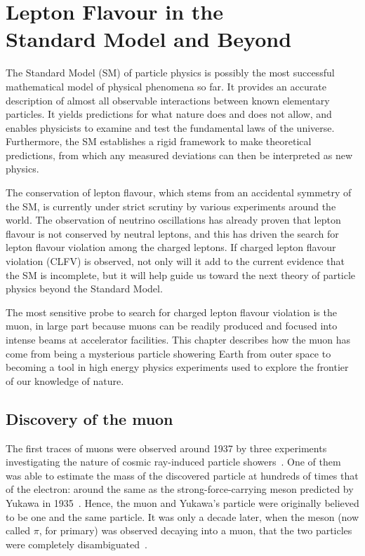 \chapter[Lepton Flavour in the Standard Model and Beyond]{Lepton Flavour in
the\\Standard Model and Beyond}\label{ch:theory}

The Standard Model (SM) of particle physics is possibly the most successful
mathematical model of physical phenomena so far. It provides an accurate
description of almost all observable interactions between known elementary
particles. It yields predictions for what nature does and does not allow, and
enables physicists to examine and test the fundamental laws of the universe.
Furthermore, the SM establishes a rigid framework to make theoretical
predictions, from which any measured deviations can then be interpreted as new
physics.

The conservation of lepton flavour, which stems from an accidental symmetry of
the SM, is currently under strict scrutiny by various experiments around the
world. The observation of neutrino oscillations has already proven that lepton
flavour is not conserved by neutral leptons, and this has driven the search for
lepton flavour violation among the charged leptons. If charged lepton flavour
violation (CLFV) is observed, not only will it add to the current evidence that
the SM is incomplete, but it will help guide us toward the next theory of
particle physics beyond the Standard Model.

The most sensitive probe to search for charged lepton flavour violation
is the muon, in large part because muons can be readily produced and focused
into intense beams at accelerator facilities. This chapter describes how the
muon has come from being a mysterious particle showering Earth from outer space
to becoming a tool in high energy physics experiments used to explore the
frontier of our knowledge of nature.


\section{Discovery of the muon}
The first traces of muons were observed around 1937 by three experiments
investigating the nature of cosmic ray-induced particle
showers~\cite{PhysRev.51.884, PhysRev.52.1198, PhysRev.52.1003}. One of them was
able to estimate the mass of the discovered particle at hundreds of times that of the
electron: around the same as the strong-force-carrying meson predicted by Yukawa
in 1935~\cite{10.1143/PTPS.1.1}. Hence, the muon and Yukawa's particle were
originally believed to be one and the same particle. It was only a decade later,
when the meson (now called $\pi$, for primary) was observed decaying into a
muon, that the two particles were completely disambiguated~\cite{LATTES1947}.

